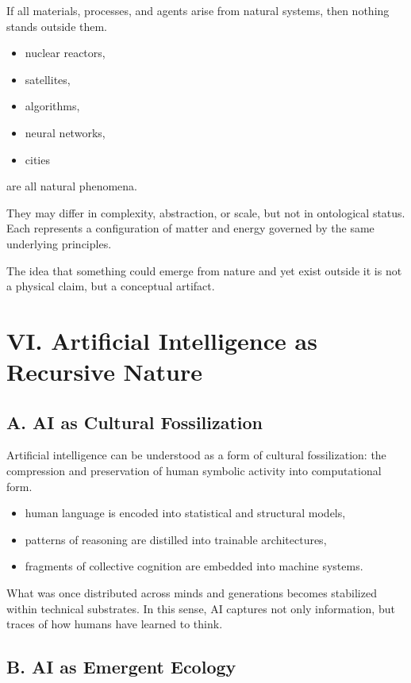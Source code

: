 \documentclass[12pt]{article}
\begin{document}
If all materials, processes, and agents arise from natural systems, then nothing stands outside them.

\begin{itemize}
    \item nuclear reactors,
    \item satellites,
    \item algorithms,
    \item neural networks,
    \item cities
\end{itemize}

are all natural phenomena.

They may differ in complexity, abstraction, or scale, but not in ontological status. Each represents a configuration of matter and energy governed by the same underlying principles.

The idea that something could emerge from nature and yet exist outside it is not a physical claim, but a conceptual artifact.


\section*{VI. Artificial Intelligence as Recursive Nature}

\subsection*{A. AI as Cultural Fossilization}

Artificial intelligence can be understood as a form of cultural fossilization: the compression and preservation of human symbolic activity into computational form.

\begin{itemize}
    \item human language is encoded into statistical and structural models,
    \item patterns of reasoning are distilled into trainable architectures,
    \item fragments of collective cognition are embedded into machine systems.
\end{itemize}

What was once distributed across minds and generations becomes stabilized within technical substrates. In this sense, AI captures not only information, but traces of how humans have learned to think.

\subsection*{B. AI as Emergent Ecology}
\end{document}

